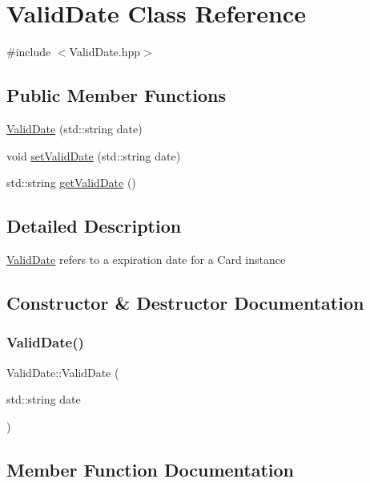 \hypertarget{class_valid_date}{}\section{Valid\+Date Class Reference}
\label{class_valid_date}


{\ttfamily \#include $<$Valid\+Date.\+hpp$>$}

\subsection*{Public Member Functions}
\begin{DoxyCompactItemize}
\item 
\mbox{\hyperlink{class_valid_date_a89bfeb8a5de9370f85df8b3fbd1fafb5}{Valid\+Date}} (std\+::string date)
\item 
void \mbox{\hyperlink{class_valid_date_a28905a1bdaa71556225b7e565735364c}{set\+Valid\+Date}} (std\+::string date)
\item 
std\+::string \mbox{\hyperlink{class_valid_date_af36a9512928582cadeb618e336f7669b}{get\+Valid\+Date}} ()
\end{DoxyCompactItemize}


\subsection{Detailed Description}
\mbox{\hyperlink{class_valid_date}{Valid\+Date}} refers to a expiration date for a Card instance 

\subsection{Constructor \& Destructor Documentation}
\mbox{\label{class_valid_date_a89bfeb8a5de9370f85df8b3fbd1fafb5}} 
\subsubsection{\texorpdfstring{ValidDate()}{ValidDate()}}
{\footnotesize\ttfamily Valid\+Date\+::\+Valid\+Date (\begin{DoxyParamCaption}\item[{std\+::string}]{date }\end{DoxyParamCaption})}



\subsection{Member Function Documentation}
\mbox{\label{class_valid_date_af36a9512928582cadeb618e336f7669b}} 
